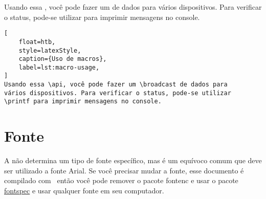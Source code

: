 Usando essa \api, você pode fazer um \broadcast de dados para vários dispositivos. Para verificar o status, pode-se utilizar \printf para imprimir mensagens no console.

\begin{lstlisting}[
    float=htb, 
    style=latexStyle, 
    caption={Uso de macros},
    label=lst:macro-usage,
]
Usando essa \api, você pode fazer um \broadcast de dados para 
vários dispositivos. Para verificar o status, pode-se utilizar 
\printf para imprimir mensagens no console.
\end{lstlisting}

\section{Fonte}

A \abnt não determina um tipo de fonte específico, mas é um equívoco comum que deve ser utilizado a fonte Arial. Se você precisar mudar a fonte, esse documento é compilado com \XeLaTeX\ então você pode remover o pacote fontenc e usar o pacote \href{https://ctan.org/pkg/fontspec}{fontspec} e usar qualquer fonte em seu computador.

